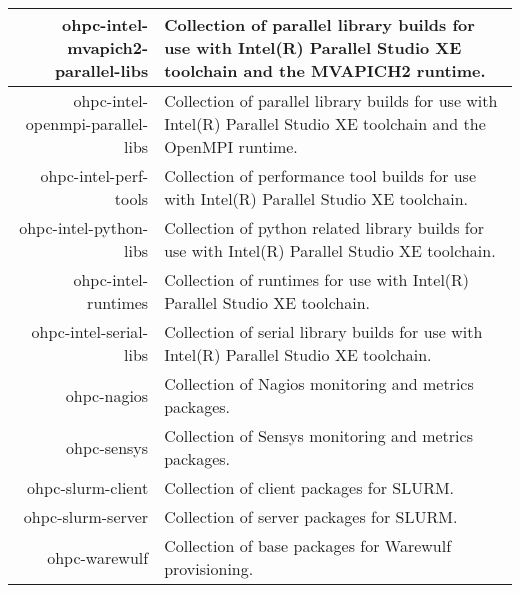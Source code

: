 \begin{tabularx}{\textwidth}{r|X}
\hline
ohpc-intel-mvapich2-parallel-libs & Collection of parallel library builds for use with Intel(R) Parallel Studio XE toolchain and the MVAPICH2 runtime. \\ 
\hline
ohpc-intel-openmpi-parallel-libs & Collection of parallel library builds for use with Intel(R) Parallel Studio XE toolchain and the OpenMPI runtime. \\ 
\hline
ohpc-intel-perf-tools & Collection of performance tool builds for use with Intel(R) Parallel Studio XE toolchain. \\ 
\hline
ohpc-intel-python-libs & Collection of python related library builds for use with Intel(R) Parallel Studio XE toolchain. \\ 
\hline
ohpc-intel-runtimes & Collection of runtimes for use with Intel(R) Parallel Studio XE toolchain. \\ 
\hline
ohpc-intel-serial-libs & Collection of serial library builds for use with Intel(R) Parallel Studio XE toolchain. \\ 
\hline
ohpc-nagios & Collection of Nagios monitoring and metrics packages. \\ 
\hline
ohpc-sensys & Collection of Sensys monitoring and metrics packages. \\ 
\hline
ohpc-slurm-client & Collection of client packages for SLURM. \\ 
\hline
ohpc-slurm-server & Collection of server packages for SLURM. \\ 
\hline
ohpc-warewulf & Collection of base packages for Warewulf provisioning. \\ 
\hline
\bottomrule
\end{tabularx}
